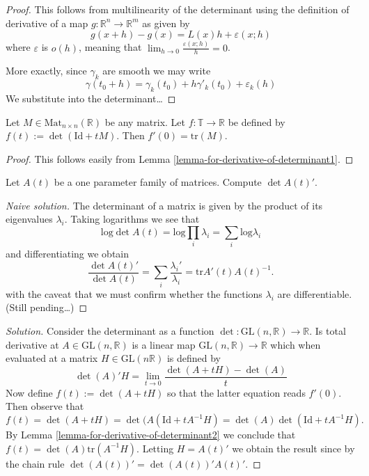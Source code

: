 \documentclass{book}
\begin{document}
\begin{proof}
This follows from multilinearity of the
determinant using the definition of
derivative of a map $g:\mathbb{R}^n \to
\mathbb{R}^m$ as given by
$$
g(x+h)-g(x)=L(x)h+\varepsilon(x;h)
$$
where $\varepsilon$ is $o(h)$, meaning that
$\lim_{h \to 0}
\frac{\varepsilon(x;h)}{h}=0$.

More exactly, since $\gamma_k$ are smooth we
may write
$$
\gamma(t_0+h)=\gamma_k(t_0)+h\gamma'_k(t_0)+
\varepsilon_k(h)
$$
We substitute into the determinant…
\end{proof}

\begin{lemma}
\label{lemma-for-derivative-of-determinant2}
Let $M \in \text{Mat}_{n\times
n}(\mathbb{R})$ be any matrix. Let
$f:\mathbb{T}\to \mathbb{R}$ be defined by
$f(t):=\det(\text{Id}+tM)$. Then
$f'(0)=\text{tr}(M)$.
\end{lemma}

\begin{proof}
This follows easily from Lemma
\ref{lemma-for-derivative-of-determinant1}.
\end{proof}

\begin{exercise}
\label{exercise-derivative-of-determinant}
Let $A(t)$ be a one parameter family of
matrices. Compute $\det A(t)'$.
\end{exercise}

\begin{proof}[Naive solution]
The determinant of a matrix is given by the
product of its eigenvalues
$\lambda_i$. Taking logarithms we see that
$$
\text{log}\det
A(t)=\text{log}\prod_{i}\lambda_i=\sum_{i}
\text{log}\lambda_i
$$
and differentiating we obtain
$$
\frac{\det A(t)'}{\det A(t)}=\sum_i
\frac{\lambda_i'}{\lambda_i}
=\text{tr} A'(t)A(t)^{-1}.
$$
with the caveat that we must confirm whether
the functions $\lambda_i$ are
differentiable. (Still pending…)
\end{proof}

\begin{proof}[Solution]
Consider the determinant as a function
$\det:\text{GL}(n,\mathbb{R})\to\mathbb{R}$.
Is total derivative at
$A \in \text{GL}(n,\mathbb{R})$ is a linear
map
$\text{GL}(n,\mathbb{R})\to \mathbb{R}$ which
when evaluated at a matrix
$H\in\text{GL}(n\mathbb{R})$ is defined by
$$
\det(A)'H=\lim_{t\to0}\frac{\det(A+tH)-
\det(A)}{t}
$$
Now define $f(t):=\det(A+tH)$ so that the
latter equation reads $f'(0)$. Then
observe that
$$
f(t)=\det(A+tH)=\det(A(\text{Id}+tA^{-1}H)=
\det(A)\det(\text{Id}+tA^{-1}H).
$$
By Lemma
\ref{lemma-for-derivative-of-determinant2} we
conclude that
$f(t)=\det(A)\text{tr}(A^{-1}H)$. Letting
$H=A(t)'$ we obtain the result since
by the chain rule
$\det(A(t))'=\det(A(t))'A(t)'$.
\end{proof}
\end{document}
